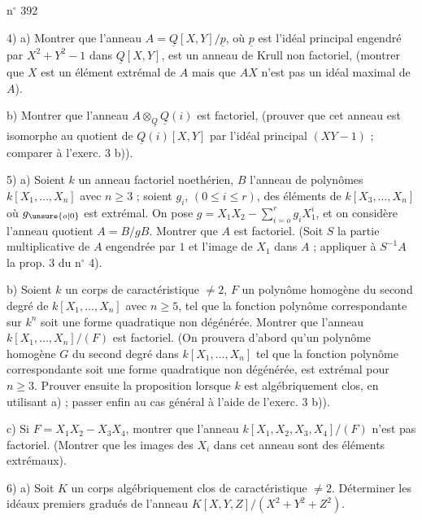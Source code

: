 \hfill n$^{\circ}$ 392

4) \qquad a) Montrer que l'anneau $A=\underline{Q}[X,Y]/\underline{p}$, où $\underline{p}$ est l'idéal principal engendré par $X^2+Y^2-1$ dans $\underline{Q}[X,Y]$, est un anneau de Krull non factoriel, (montrer que $X$ est un élément extrémal de $A$ mais que $AX$ n'est pas un idéal maximal de $A$).

b) Montrer que l'anneau $A\otimes_{\underline{Q}}\underline{Q}(i)$ est factoriel, (prouver que cet anneau est isomorphe au quotient de $\underline{Q}(i)[X,Y]$ par l'idéal principal $(XY-1)$ ; comparer à l'exerc. 3 b)).

5) \qquad a) Soient $k$ un anneau factoriel noethérien, $B$ l'anneau de polynômes $k[X_1,\ldots,X_n]$ avec $n\geq 3$ ; soient $g_i$, $(0\leq i\leq r)$, des éléments de $k[X_3,\ldots,X_n]$ où $g_{\unsure{o|0}}$ est extrémal. On pose $g=X_1X_2-\sum_{i=o}^{r}g_iX_1^{i}$, et on considère l'anneau quotient $A=B/gB$. Montrer que $A$ est factoriel. (Soit $S$ la partie multiplicative de $A$ engendrée par $1$ et l'image de $X_1$ dans $A$ ; appliquer à $S^{-1}A$ la prop. 3 du n$^{\circ}$ 4).

b) Soient $k$ un corps de caractéristique $\ne 2$, $F$ un polynôme homogène du second degré de $k[X_1,\ldots,X_n]$ avec $n\geq 5$, tel que la fonction polynôme correspondante sur $k^n$ soit une forme quadratique non dégénérée. Montrer que l'anneau $k[X_1,\ldots,X_n]/(F)$ est factoriel. (On prouvera d'abord qu'un polynôme homogène $G$ du second degré dans $k[X_1,\ldots,X_n]$ tel que la fonction polynôme correspondante soit une forme quadratique non dégénérée, est extrémal pour $n\geq 3$. Prouver ensuite la proposition lorsque $k$ est algébriquement clos, en utilisant a) ; passer enfin au cas général à l'aide de l'exerc. 3 b)).

c) Si $F=X_1X_2-X_3X_4$, montrer que l'anneau $k[X_1,X_2,X_3,X_4]/(F)$ n'est pas factoriel. (Montrer que les images des $X_i$ dans cet anneau sont des éléments extrémaux).

6) \qquad a) Soit $K$ un corps algébriquement clos de caractéristique $\ne 2$. Déterminer les idéaux premiers gradués de l'anneau $K[X,Y,Z]/(X^2+Y^2+Z^2)$.

